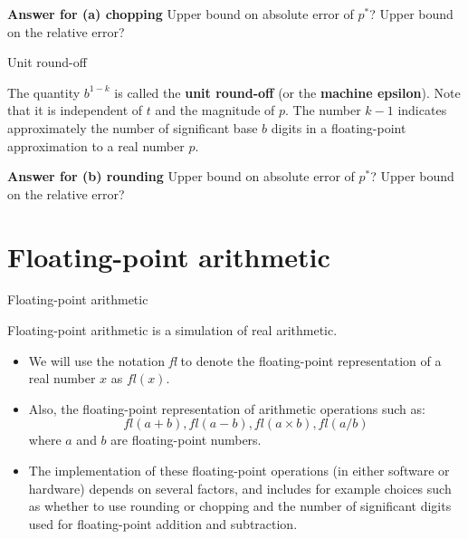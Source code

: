 \documentclass[12pt]{beamer}
\begin{document}
\begin{frame}
{\bf Answer for (a) chopping} Upper bound on absolute error of $p^*$? Upper bound on the relative error?
\vspace{3 in}


\end{frame} 

\begin{frame}{Unit round-off}

\begin{definition}
The quantity $b^{1-k}$ is called the {\bf unit round-off} (or the {\bf machine epsilon}). Note that it is independent of $t$ and the magnitude of $p$. The number $k-1$ indicates approximately the number of significant base $b$ digits in a floating-point approximation to a real number $p$. 
\end{definition}
\end{frame} 

\begin{frame}
{\bf Answer for (b) rounding} Upper bound on absolute error of $p^*$? Upper bound on the relative error?
\vspace{3 in}


\end{frame} 

\section{Floating-point arithmetic} 

\begin{frame}{Floating-point arithmetic} 

Floating-point arithmetic is a simulation of real arithmetic.

\begin{itemize}

\item{We will use the notation {\it fl} to denote the floating-point representation
of a real number $x$ as $fl(x)$.} 
\item{Also, the floating-point representation of arithmetic operations such as: 
\[
fl(a+b), fl(a-b), fl(a \times b), fl(a/b) 
\]
\noindent
where $a$ and $b$ are floating-point numbers.} 

\item{The implementation of these floating-point operations (in either software or hardware) depends on several factors, and includes for example choices such as whether to use rounding or chopping and the number of significant digits used for floating-point addition and subtraction.}

\end{itemize} 
\end{frame}
\end{document}
